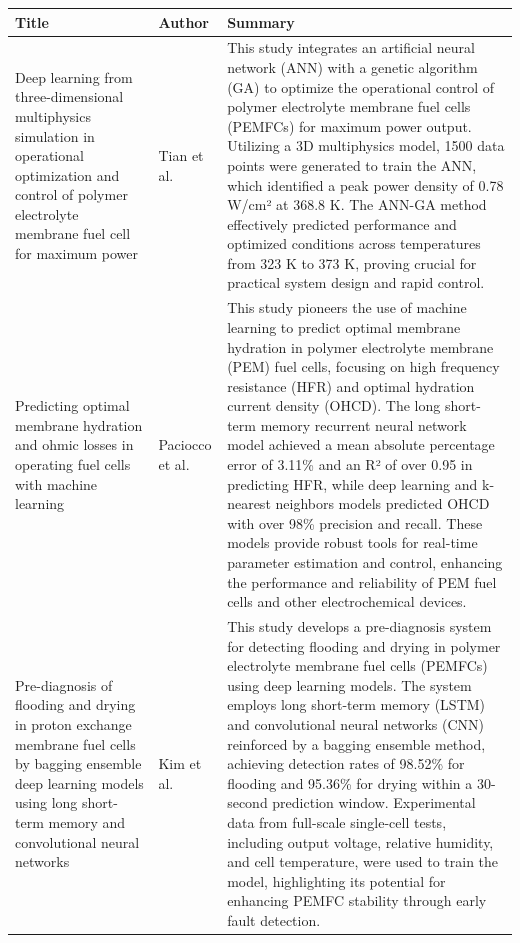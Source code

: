     \newpage \begin{table}[H]
    \centering
    \begin{tabularx}{\textwidth}{HIJ} %
    \toprule
    \textbf{Title} & \textbf{Author} & \textbf{Summary} \\ 
    \midrule
    Deep learning from three-dimensional multiphysics simulation in operational optimization and control of polymer electrolyte membrane fuel cell for maximum power & Tian et al. & This study integrates an artificial neural network (ANN) with a genetic algorithm (GA) to optimize the operational control of polymer electrolyte membrane fuel cells (PEMFCs) for maximum power output. Utilizing a 3D multiphysics model, 1500 data points were generated to train the ANN, which identified a peak power density of 0.78 W/cm² at 368.8 K. The ANN-GA method effectively predicted performance and optimized conditions across temperatures from 323 K to 373 K, proving crucial for practical system design and rapid control. \\
    \midrule
    Predicting optimal membrane hydration and ohmic losses in operating fuel cells with machine learning & Paciocco et al. & This study pioneers the use of machine learning to predict optimal membrane hydration in polymer electrolyte membrane (PEM) fuel cells, focusing on high frequency resistance (HFR) and optimal hydration current density (OHCD). The long short-term memory recurrent neural network model achieved a mean absolute percentage error of 3.11\% and an R² of over 0.95 in predicting HFR, while deep learning and k-nearest neighbors models predicted OHCD with over 98\% precision and recall. These models provide robust tools for real-time parameter estimation and control, enhancing the performance and reliability of PEM fuel cells and other electrochemical devices. \\
    \midrule
    Pre-diagnosis of flooding and drying in proton exchange membrane fuel cells by bagging ensemble deep learning models using long short-term memory and convolutional neural networks & Kim et al. & This study develops a pre-diagnosis system for detecting flooding and drying in polymer electrolyte membrane fuel cells (PEMFCs) using deep learning models. The system employs long short-term memory (LSTM) and convolutional neural networks (CNN) reinforced by a bagging ensemble method, achieving detection rates of 98.52\% for flooding and 95.36\% for drying within a 30-second prediction window. Experimental data from full-scale single-cell tests, including output voltage, relative humidity, and cell temperature, were used to train the model, highlighting its potential for enhancing PEMFC stability through early fault detection. \\

\end{tabularx}
\end{table}
